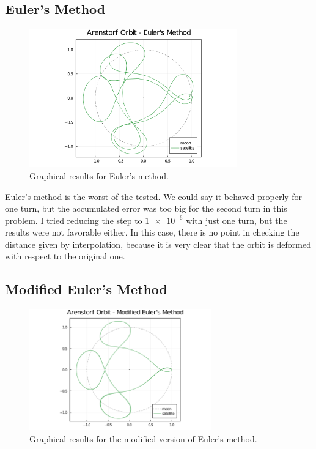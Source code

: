 \documentclass[12pt, onside]{article}
\begin{document}
\subsection{Euler's Method}

\begin{figure}[H]
    \centering
    \includegraphics[width=0.8\textwidth]{media/arenstorf/euler.png}
    \caption{Graphical results for Euler's method.}
\end{figure}

    Euler's method is the worst of the tested.
We could say it behaved properly for one turn,
but the accumulated error was too big for the second turn in this problem.
I tried reducing the step to $\num{1e-6}$ with just one turn,
but the results were not favorable either.
In this case, there is no point in checking the distance given by interpolation,
because it is very clear that the orbit is deformed with respect to the original one.



\subsection{Modified Euler's Method}

\begin{figure}[H]
    \centering
    \includegraphics[width=0.7\textwidth]{media/arenstorf/mod_euler.png}
    \caption{Graphical results for the modified version of Euler's method.}
    \label{fig:mod_euler}
\end{figure}
\end{document}
